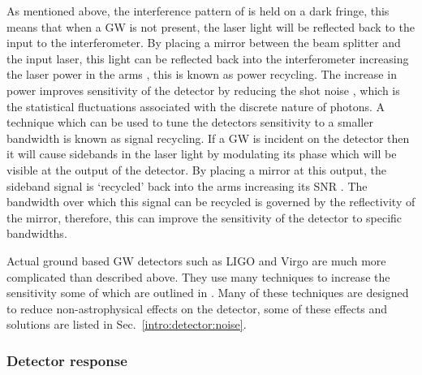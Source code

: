 As mentioned above, the interference pattern of is held on a dark fringe, this
means that when a \gls{GW} is not present, the laser light will be reflected
back to the input to the interferometer.  By placing a mirror between the beam
splitter and the input laser, this light can be reflected back into the
interferometer increasing the laser power in the arms
\citep{pitkin2011GravitationalWave}, this is known as power recycling. The
increase in power improves sensitivity of the detector by reducing the shot
noise \citep{abbott2009LIGOLaser}, which is the statistical fluctuations
associated with the discrete nature of photons.  A technique which can be used
to tune the detectors sensitivity to a smaller bandwidth is known as signal
recycling.  If a \gls{GW} is incident on the detector then it will cause
sidebands in the laser light by modulating its phase which will be visible at the output of the
detector.
By placing a mirror at this output, the sideband signal is `recycled' back into
the arms increasing its \gls{SNR} \citep{pitkin2011GravitationalWave}. The
bandwidth over which this signal can be recycled is governed by the
reflectivity of the mirror, therefore, this can improve the sensitivity of the
detector to specific bandwidths. 

Actual ground based \gls{GW} detectors such as \gls{LIGO} \citep{abbott2009LIGOLaser} and
Virgo \citep{acernese2015AdvancedVirgo} are much more complicated than
described above.  They use many techniques to increase the sensitivity some of
which are outlined in \citep{aasi2015AdvancedLIGO,abbott2009LIGOLaser}.  Many of these techniques are
designed to reduce non-astrophysical effects on the detector,
some of these effects and solutions are listed in
Sec.~\ref{intro:detector:noise}.

\subsubsection{\label{intro:detector:response}Detector response}

